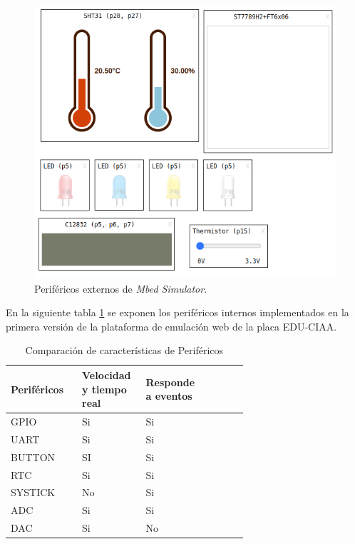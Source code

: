 \begin{figure}[ht]
	\centering
	\includegraphics[scale=.81]{./Figures/perifericosMBED.png}
	\caption{Periféricos externos de \textit{Mbed Simulator}.}
	\label{fig:perifericosMbed}
\end{figure}

En la siguiente tabla \ref{tab:perifericosInternosCIAA} se exponen los  periféricos internos implementados en la primera versión de la plataforma de emulación web de la placa EDU-CIAA.

\begin{table}[h]
\centering
\caption[Comparación de características de periféricos internos del Emulador EDU-CIAA]{Comparación de características de Periféricos}
\begin{tabular}{p{0.24\linewidth} p{0.14\linewidth}  p{0.14\linewidth}  p{0.14\linewidth}}
\toprule
\textbf{Periféricos} 
& \textbf{Velocidad y tiempo real}
& \textbf{Responde a eventos}
\\
\midrule
GPIO & Si & Si  \\
UART & Si & Si \\
BUTTON & SI & Si \\
RTC & Si & Si  \\
SYSTICK & No & Si \\
ADC & Si & Si \\
DAC & Si & No \\
\bottomrule
\hline
\end{tabular}
\label{tab:perifericosInternosCIAA}
\end{table}


